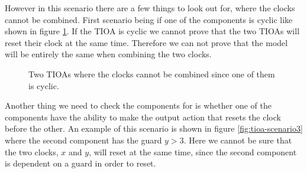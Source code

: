 However in this scenario there are a few things to look out for, where the clocks cannot be combined. First scenario being if one of the components is cyclic like shown in figure \ref{fig:tioa-scenario2}. If the TIOA is cyclic we cannot prove that the two TIOAs will reset their clock at the same time. Therefore we can not prove that the model will be entirely the same when combining the two clocks. 

\begin{figure}[H]
    \centering
    \caption{Two TIOAs where the clocks cannot be combined since one of them is cyclic.}
    \label{fig:tioa-scenario2}
\end{figure}


Another thing we need to check the components for is whether one of the components have the ability to make the output action that resets the clock before the other. An example of this scenario is shown in figure \ref{fig:tioa-scenario3} where the second component has the guard $y > 3$. Here we cannot be sure that the two clocks, $x$ and $y$, will reset at the same time, since the second component is dependent on a guard in order to reset.

